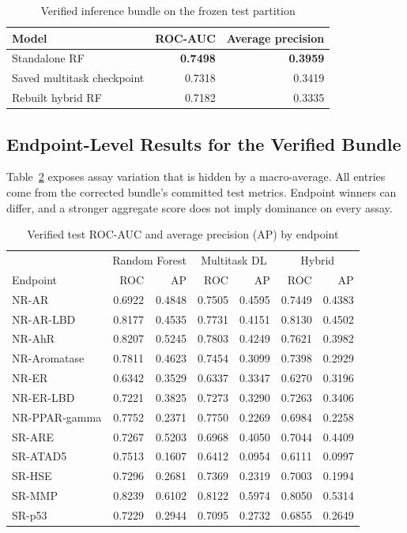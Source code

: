 \documentclass[11pt,a4paper]{article}\usepackage[margin=25mm]{geometry}\usepackage{fancyhdr}\usepackage{setspace}\usepackage{titlesec}\usepackage{xcolor}
\begin{document}
\begin{table}[t]
\caption{Verified inference bundle on the frozen test partition}
\label{tab:verified}\centering
\begin{tabular}{lrr}\toprule
Model & ROC-AUC & Average precision\\\midrule
Standalone RF & \textbf{0.7498} & \textbf{0.3959}\\
Saved multitask checkpoint & 0.7318 & 0.3419\\
Rebuilt hybrid RF & 0.7182 & 0.3335\\\bottomrule
\end{tabular}
\end{table}

\subsection{Endpoint-Level Results for the Verified Bundle}
Table~\ref{tab:endpoints} exposes assay variation that is hidden by a macro-average. All entries come from the corrected bundle's committed test metrics. Endpoint winners can differ, and a stronger aggregate score does not imply dominance on every assay.
\begin{table}[htbp]\centering\small
\caption{Verified test ROC-AUC and average precision (AP) by endpoint}
\label{tab:endpoints}
\begin{tabular}{lrrrrrr}\toprule
& \multicolumn{2}{c}{Random Forest} & \multicolumn{2}{c}{Multitask DL} & \multicolumn{2}{c}{Hybrid}\\
Endpoint & ROC & AP & ROC & AP & ROC & AP\\\midrule
NR-AR & 0.6922 & 0.4848 & 0.7505 & 0.4595 & 0.7449 & 0.4383\\
NR-AR-LBD & 0.8177 & 0.4535 & 0.7731 & 0.4151 & 0.8130 & 0.4502\\
NR-AhR & 0.8207 & 0.5245 & 0.7803 & 0.4249 & 0.7621 & 0.3982\\
NR-Aromatase & 0.7811 & 0.4623 & 0.7454 & 0.3099 & 0.7398 & 0.2929\\
NR-ER & 0.6342 & 0.3529 & 0.6337 & 0.3347 & 0.6270 & 0.3196\\
NR-ER-LBD & 0.7221 & 0.3825 & 0.7273 & 0.3290 & 0.7263 & 0.3406\\
NR-PPAR-gamma & 0.7752 & 0.2371 & 0.7750 & 0.2269 & 0.6984 & 0.2258\\
SR-ARE & 0.7267 & 0.5203 & 0.6968 & 0.4050 & 0.7044 & 0.4409\\
SR-ATAD5 & 0.7513 & 0.1607 & 0.6412 & 0.0954 & 0.6111 & 0.0997\\
SR-HSE & 0.7296 & 0.2681 & 0.7369 & 0.2319 & 0.7003 & 0.1994\\
SR-MMP & 0.8239 & 0.6102 & 0.8122 & 0.5974 & 0.8050 & 0.5314\\
SR-p53 & 0.7229 & 0.2944 & 0.7095 & 0.2732 & 0.6855 & 0.2649\\
\bottomrule\end{tabular}\end{table}
\end{document}
